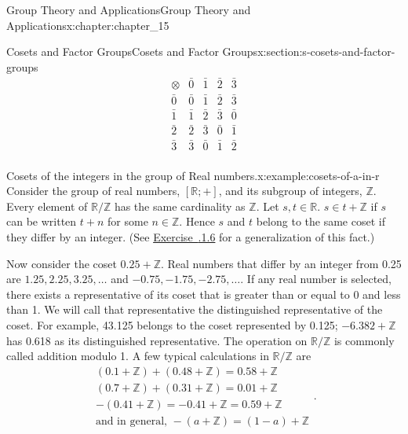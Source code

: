 \documentclass[oneside,10pt,]{book}
\newcommand{\xreffont}{\relax}
\numberwithin{equation}{section}
\begin{document}
\begin{chapterptx}{Group Theory and Applications}{}{Group Theory and Applications}{}{}{x:chapter:chapter_15}
\begin{sectionptx}{Cosets and Factor Groups}{}{Cosets and Factor Groups}{}{}{x:section:s-cosets-and-factor-groups}
\begin{equation*}
\begin{array}{c|cccc}
\otimes & \bar{0} & \bar{1} & \bar{2}  & \bar{3}\\
\hline
\bar{0} & \bar{0} & \bar{1}  & \bar{2}  & \bar{3}\\
\bar{1} & \bar{1} & \bar{2}  & \bar{3} & \bar{0}\\
\bar{2} & \bar{2}  &\bar{3} & \bar{0} & \bar{1}\\
\bar{3} & \bar{3}& \bar{0}   & \bar{1} & \bar{2} \\
\end{array}
\end{equation*}
%
\begin{example}{Cosets of the integers in the group of Real numbers.}{x:example:cosets-of-a-in-r}%
Consider the group of real numbers, \([\mathbb{R}; +]\), and its subgroup of integers, \(\mathbb{Z}\). Every element of \(\mathbb{R}/\mathbb{Z}\) has the same cardinality as \(\mathbb{Z}\). Let \(s, t\in \mathbb{R}\). \(s\in t+\mathbb{Z}\) if \(s\) can be written \(t+n\) for some \(n \in \mathbb{Z}\).  Hence \(s\) and \(t\) belong to the same coset if they differ by an integer. (See \hyperlink{x:exercise:exercise-15-2-6}{Exercise~{\xreffont 15.2.1.6}} for a generalization of this fact.)%
\par
Now consider the coset \(0.25+\mathbb{Z}\). Real numbers that differ by an integer from 0.25 are \(1.25, 2.25, 3.25, \ldots\) and \(-0.75, -1.75, -2.75, \ldots\).  If any real number is selected, there exists a representative of its coset that is greater than or equal to 0 and less than 1. We will call that representative the distinguished representative of the coset. For example, 43.125 belongs to the coset represented by 0.125; \(-6.382+\mathbb{Z}\) has 0.618 as its distinguished representative. The operation on \(\mathbb{R}/\mathbb{Z}\) is commonly called addition modulo 1. A few typical calculations in \(\mathbb{R}/\mathbb{Z}\) are%
\begin{equation*}
\begin{array}{c}
(0.1+\mathbb{Z})+(0.48+\mathbb{Z}) = 0.58+\mathbb{Z}\\
(0.7+\mathbb{Z})+(0.31+\mathbb{Z}) = 0.01+\mathbb{Z}\\
-(0.41+\mathbb{Z}) = -0.41+\mathbb{Z} = 0.59+\mathbb{Z}\\
\textrm{and in general, } -(a+\mathbb{Z}) = (1 - a)+\mathbb{Z}
\end{array}\text{.}
\end{equation*}
%
\end{example}

\end{sectionptx}
\end{chapterptx}
\end{document}
